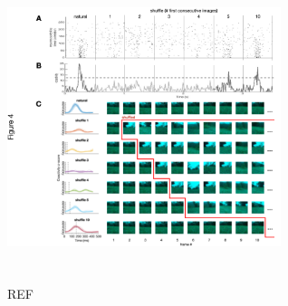 \documentclass[9pt,twocolumn,twoside,lineno]{pnas-new}
\begin{document}
\begin{figure}
\centering
\includegraphics[width=8cm,height=9cm]{Fig 4.png}
\caption{REF}
\label{fig:Figure_4.pdf}
\end{figure}


\end{document}
